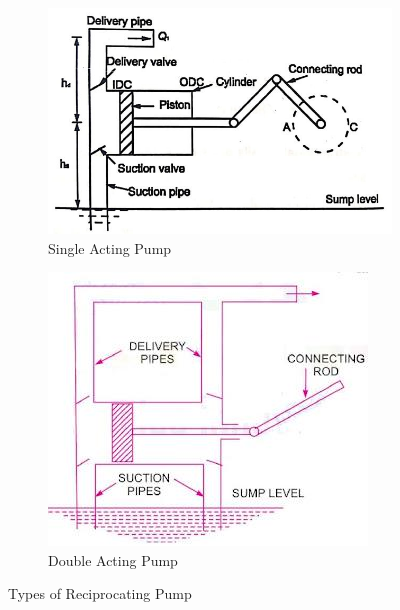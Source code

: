 \documentclass{article}
\begin{document}
\begin{figure}[H]
  \centering
  \begin{subfigure}[b]{0.4\textwidth}
    \centering
    \includegraphics[width=\textwidth]{img/single_acting.jpg}
    \caption{Single Acting Pump}
    \label{fig:image1}
  \end{subfigure}
  \hfill
  \begin{subfigure}[b]{0.4\textwidth}
    \centering
    \includegraphics[width=\textwidth]{img/double_acting.jpg}
    \caption{Double Acting Pump}
    \label{fig:image2}
  \end{subfigure}
  \caption{Types of Reciprocating Pump}
  \label{fig:two_images}
\end{figure}
\end{document}
